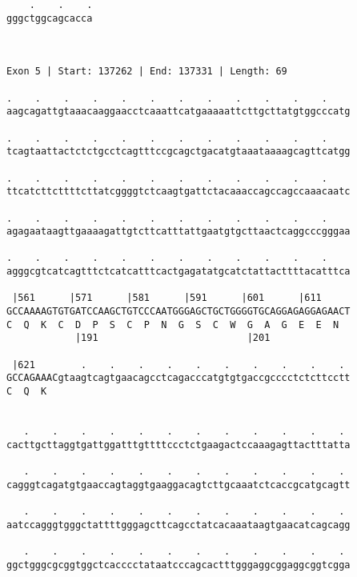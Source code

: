 \documentclass{article}
\begin{document}
\begin{Verbatim}
    .    .    .
gggctggcagcacca
               
               
 
Exon 5 | Start: 137262 | End: 137331 | Length: 69
 
.    .    .    .    .    .    .    .    .    .    .    .    
aagcagattgtaaacaaggaacctcaaattcatgaaaaattcttgcttatgtggcccatg
                                                            
.    .    .    .    .    .    .    .    .    .    .    .    
tcagtaattactctctgcctcagtttccgcagctgacatgtaaataaaagcagttcatgg
                                                            
.    .    .    .    .    .    .    .    .    .    .    .    
ttcatcttcttttcttatcggggtctcaagtgattctacaaaccagccagccaaacaatc
                                                            
.    .    .    .    .    .    .    .    .    .    .    .    
agagaataagttgaaaagattgtcttcatttattgaatgtgcttaactcaggcccgggaa
                                                            
.    .    .    .    .    .    .    .    .    .    .    .    
agggcgtcatcagtttctcatcatttcactgagatatgcatctattacttttacatttca
                                                            
 |561      |571      |581      |591      |601      |611     
GCCAAAAGTGTGATCCAAGCTGTCCCAATGGGAGCTGCTGGGGTGCAGGAGAGGAGAACT
C  Q  K  C  D  P  S  C  P  N  G  S  C  W  G  A  G  E  E  N  
            |191                          |201              
  
 |621        .    .    .    .    .    .    .    .    .    . 
GCCAGAAACgtaagtcagtgaacagcctcagacccatgtgtgaccgcccctctcttcctt
C  Q  K                                                     
                                                            
  
   .    .    .    .    .    .    .    .    .    .    .    . 
cacttgcttaggtgattggatttgttttccctctgaagactccaaagagttactttatta
                                                            
   .    .    .    .    .    .    .    .    .    .    .    . 
cagggtcagatgtgaaccagtaggtgaaggacagtcttgcaaatctcaccgcatgcagtt
                                                            
   .    .    .    .    .    .    .    .    .    .    .    . 
aatccagggtgggctattttgggagcttcagcctatcacaaataagtgaacatcagcagg
                                                            
   .    .    .    .    .    .    .    .    .    .    .    . 
ggctgggcgcggtggctcacccctataatcccagcactttgggaggcggaggcggtcgga
                                                            

\end{Verbatim}
\end{document}
